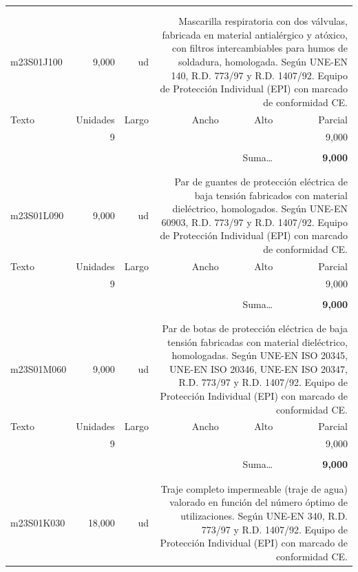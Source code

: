 \documentclass{book}%
\begin{document}
\begin{longtable}{lrrrrr}
\hline%
&&&&&\\%
&&&&&\\%
m23S01J100&     9,000& ud&\multicolumn{3}{p{6cm}}{\scriptsize Mascarilla respiratoria con dos válvulas, fabricada en material antialérgico y atóxico, con filtros intercambiables para humos de soldadura, homologada. Según UNE-EN 140, R.D. 773/97 y R.D. 1407/92. Equipo de Protección Individual (EPI) con marcado de conformidad CE.\normalsize}\\%
Texto&Unidades&Largo&Ancho&Alto&Parcial\\%
\hline%
\multicolumn{1}{p{3.5cm}}{ }&9&&&&     9,000\\%
&&&&&\\%
\multicolumn{5}{r}{Suma\ldots}&\textbf{     9,000}\\%
\hline%
&&&&&\\%
&&&&&\\%
m23S01L090&     9,000& ud&\multicolumn{3}{p{6cm}}{\scriptsize Par de guantes de protección eléctrica de baja tensión fabricados con material dieléctrico, homologados. Según UNE-EN 60903, R.D. 773/97 y R.D. 1407/92. Equipo de Protección Individual (EPI) con marcado de conformidad CE.\normalsize}\\%
Texto&Unidades&Largo&Ancho&Alto&Parcial\\%
\hline%
\multicolumn{1}{p{3.5cm}}{ }&9&&&&     9,000\\%
&&&&&\\%
\multicolumn{5}{r}{Suma\ldots}&\textbf{     9,000}\\%
\hline%
&&&&&\\%
&&&&&\\%
m23S01M060&     9,000& ud&\multicolumn{3}{p{6cm}}{\scriptsize Par de botas de protección eléctrica de baja tensión fabricadas con material dieléctrico, homologadas. Según UNE-EN ISO 20345, UNE-EN ISO 20346, UNE-EN ISO 20347, R.D. 773/97 y R.D. 1407/92. Equipo de Protección Individual (EPI) con marcado de conformidad CE.\normalsize}\\%
Texto&Unidades&Largo&Ancho&Alto&Parcial\\%
\hline%
\multicolumn{1}{p{3.5cm}}{ }&9&&&&     9,000\\%
&&&&&\\%
\multicolumn{5}{r}{Suma\ldots}&\textbf{     9,000}\\%
\hline%
&&&&&\\%
&&&&&\\%
m23S01K030&    18,000& ud&\multicolumn{3}{p{6cm}}{\scriptsize Traje completo impermeable (traje de agua) valorado en función del número óptimo de utilizaciones. Según UNE-EN 340, R.D. 773/97 y R.D. 1407/92. Equipo de Protección Individual (EPI) con marcado de conformidad CE.\normalsize}\\%

\end{longtable}
\end{document}
